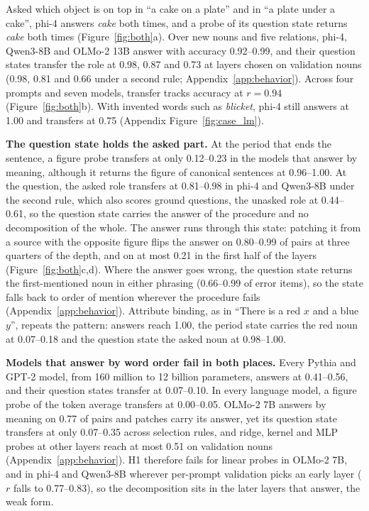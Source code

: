 \documentclass{article}
\theoremstyle{plain}
\theoremstyle{remark}
\begin{document}
Asked which object is on top in ``a cake on a plate'' and in ``a plate under a cake'', phi-4 answers \emph{cake} both times, and a probe of its question state returns \emph{cake} both times (Figure~\ref{fig:both}a). Over new nouns and five relations, phi-4, Qwen3-8B and OLMo-2 13B answer with accuracy 0.92--0.99, and their question states transfer the role at 0.98, 0.87 and 0.73 at layers chosen on validation nouns (0.98, 0.81 and 0.66 under a second rule; Appendix~\ref{app:behavior}). Across four prompts and seven models, transfer tracks accuracy at $r = 0.94$ (Figure~\ref{fig:both}b). With invented words such as \emph{blicket}, phi-4 still answers at 1.00 and transfers at 0.75 (Appendix Figure~\ref{fig:case_lm}).

\textbf{The question state holds the asked part.} At the period that ends the sentence, a figure probe transfers at only 0.12--0.23 in the models that answer by meaning, although it returns the figure of canonical sentences at 0.96--1.00. At the question, the asked role transfers at 0.81--0.98 in phi-4 and Qwen3-8B under the second rule, which also scores ground questions, the unasked role at 0.44--0.61, so the question state carries the answer of the procedure and no decomposition of the whole. The answer runs through this state: patching it from a source with the opposite figure flips the answer on 0.80--0.99 of pairs at three quarters of the depth, and on at most 0.21 in the first half of the layers (Figure~\ref{fig:both}c,d). Where the answer goes wrong, the question state returns the first-mentioned noun in either phrasing (0.66--0.99 of error items), so the state falls back to order of mention wherever the procedure fails (Appendix~\ref{app:behavior}). Attribute binding, as in ``There is a red $x$ and a blue $y$'', repeats the pattern: answers reach 1.00, the period state carries the red noun at 0.07--0.18 and the question state the asked noun at 0.98--1.00.

\textbf{Models that answer by word order fail in both places.} Every Pythia and GPT-2 model, from 160 million to 12 billion parameters, answers at 0.41--0.56, and their question states transfer at 0.07--0.10. In every language model, a figure probe of the token average transfers at 0.00--0.05. OLMo-2 7B answers by meaning on 0.77 of pairs and patches carry its answer, yet its question state transfers at only 0.07--0.35 across selection rules, and ridge, kernel and MLP probes at other layers reach at most 0.51 on validation nouns (Appendix~\ref{app:behavior}). H1 therefore fails for linear probes in OLMo-2 7B, and in phi-4 and Qwen3-8B wherever per-prompt validation picks an early layer ($r$ falls to 0.77--0.83), so the decomposition sits in the later layers that answer, the weak form.
\end{document}
